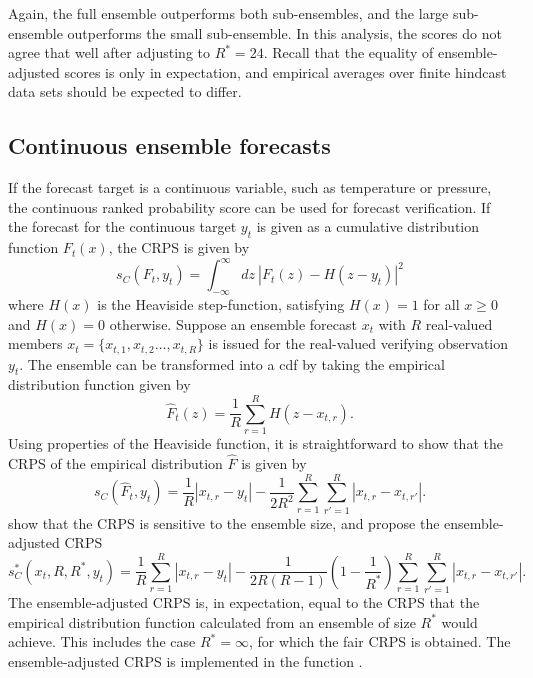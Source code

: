 \documentclass[article]{jss}\usepackage{graphicx, color}
\begin{document}
Again, the full ensemble outperforms both sub-ensembles, and the large sub-ensemble outperforms the small sub-ensemble.
In this analysis, the scores do not agree that well after adjusting to $R^* = 24$.
Recall that the equality of ensemble-adjusted scores is only in expectation, and empirical averages over finite hindcast data sets should be expected to differ.

\subsection{Continuous ensemble forecasts}


If the forecast target is a continuous variable, such as temperature or pressure, the continuous ranked probability score \citep{matheson1976scoring} can be used for forecast verification.
If the forecast for the continuous target $y_t$ is given as a cumulative distribution function $F_t(x)$, the CRPS is given by 
%
\begin{equation}
s_{C}(F_t, y_t) = \int_{-\infty}^\infty dz\ \left|F_t(z) - H(z-y_t)\right|^2
\label{eq:crps}
\end{equation}
%
where $H(x)$ is the Heaviside step-function, satisfying $H(x)=1$ for all $x\ge 0$ and $H(x)=0$ otherwise.
Suppose an ensemble forecast $x_t$ with $R$ real-valued members $x_t = \{x_{t,1}, x_{t,2} \dots, x_{t,R}\}$ is issued for the real-valued verifying observation $y_t$.
The ensemble can be transformed into a cdf by taking the empirical distribution function given by 
%
\begin{equation}
\hat{F}_t(z) = \frac{1}{R} \sum_{r=1}^{R} H(z - x_{t,r}).
\end{equation}
%
Using properties of the Heaviside function, it is straightforward to show that the CRPS of the empirical distribution $\hat{F}$ is given by
%
\begin{equation}
s_{C}(\hat{F}_t, y_t) = \frac{1}{R}|x_{t,r}-y_t| - \frac{1}{2R^2} \sum_{r=1}^R \sum_{r'=1}^R |x_{t,r}-x_{t,r'}|.
\end{equation}
%
\citet{fricker2013three} show that the CRPS is sensitive to the ensemble size, and propose the ensemble-adjusted CRPS
%
\begin{equation}
s_{C}^*(x_t, R, R^*, y_t) = \frac{1}{R}\sum_{r=1}^R |x_{t,r} - y_t| - \frac{1}{2R(R-1)}\left(1-\frac{1}{R^*}\right) \sum_{r=1}^R\sum_{r'=1}^R |x_{t,r}-x_{t,r'}|.
\end{equation}
%
The ensemble-adjusted CRPS is, in expectation, equal to the CRPS that the empirical distribution function calculated from an ensemble of size $R^*$ would achieve.
This includes the case $R^*=\infty$, for which the fair CRPS is obtained.
The ensemble-adjusted CRPS is implemented in the  function .
\end{document}
